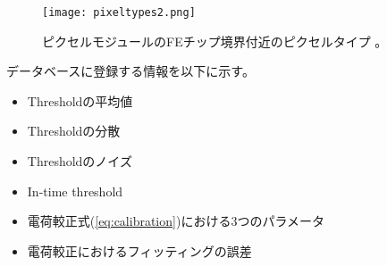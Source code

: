 \begin{figure}[tbp]
  \centering
  \texttt{[image: pixeltypes2.png]}
  \caption[ピクセルモジュールのFEチップ境界付近のピクセルタイプ]{ピクセルモジュールのFEチップ境界付近のピクセルタイプ \cite{pixeltypes}。}
  \label{fig:pixeltypes}
\end{figure}

データベースに登録する情報を以下に示す。
\begin{itemize}
  \item Thresholdの平均値
  \item Thresholdの分散
  \item Thresholdのノイズ
  \item In-time threshold
  \item 電荷較正式(\ref{eq:calibration})における3つのパラメータ
  \item 電荷較正におけるフィッティングの誤差
\end{itemize}




\newpage

